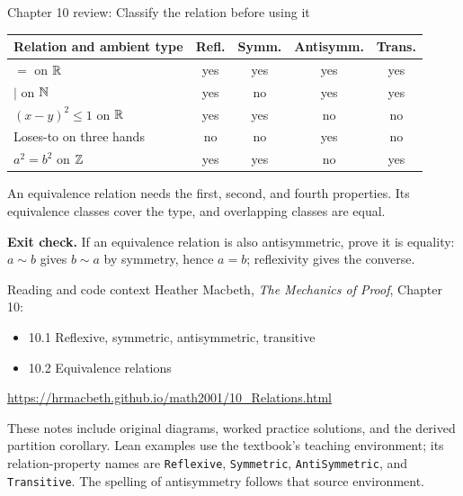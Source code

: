 \begin{frame}{Chapter 10 review: Classify the relation before using it}
\begin{center}
\begin{tabular}{lcccc}
\toprule
Relation and ambient type & Refl. & Symm. & Antisymm. & Trans.\\\midrule
$=$ on $\mathbb{R}$ & yes & yes & yes & yes\\
$\mid$ on $\mathbb{N}$ & yes & no & yes & yes\\
$(x-y)^2\le1$ on $\mathbb{R}$ & yes & yes & no & no\\
Loses-to on three hands & no & no & yes & no\\
$a^2=b^2$ on $\mathbb{Z}$ & yes & yes & no & yes\\
\bottomrule
\end{tabular}
\end{center}
An equivalence relation needs the first, second, and fourth properties.
Its equivalence classes cover the type, and overlapping classes are equal.
\medskip

\textbf{Exit check.} If an equivalence relation is also antisymmetric, prove it is equality:
$a\sim b$ gives $b\sim a$ by symmetry, hence $a=b$; reflexivity gives the converse.
\end{frame}

\begin{frame}{Reading and code context}
Heather Macbeth, \emph{The Mechanics of Proof}, Chapter 10:
\begin{itemize}
\item 10.1 Reflexive, symmetric, antisymmetric, transitive
\item 10.2 Equivalence relations
\end{itemize}
\url{https://hrmacbeth.github.io/math2001/10_Relations.html}
\medskip

These notes include original diagrams, worked practice solutions, and the derived partition corollary.
Lean examples use the textbook's teaching environment; its relation-property names are
\texttt{Reflexive}, \texttt{Symmetric}, \texttt{AntiSymmetric}, and \texttt{Transitive}.
The spelling of antisymmetry follows that source environment.
\end{frame}

